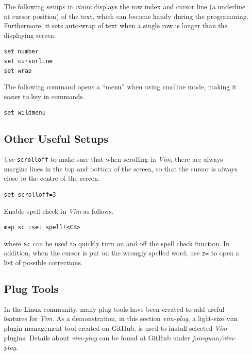The following setups in \textit{vimrc} displays the row index and cursor line (a underline at cursor position) of the text, which can become handy during the programming. Furthermore, it sets auto-wrap of text when a single row is longer than the displaying screen.
\begin{lstlisting}
set number
set cursorline
set wrap
\end{lstlisting}

The following command opens a ``menu'' when using cmdline mode, making it easier to key in commands.
\begin{lstlisting}
set wildmenu
\end{lstlisting}

\subsection{Other Useful Setups}

Use \verb|scrolloff| to make sure that when scrolling in \textit{Vim}, there are always margins lines in the top and bottom of the screen, so that the cursor is always close to the centre of the screen.
\begin{lstlisting}
set scrolloff=3
\end{lstlisting}

Enable spell check in \textit{Vim} as follows.
\begin{lstlisting}
map sc :set spell!<CR>
\end{lstlisting}
where \verb|sc| can be used to quickly turn on and off the spell check function. In addition, when the cursor is put on the wrongly spelled word, use \verb|z=| to open a list of possible corrections.

\subsection{Plug Tools}

In the Linux community, many plug tools have been created to add useful features for \textit{Vim}. As a demonstration, in this section \textit{vim-plug}, a light-size vim plugin management tool created on GitHub, is used to install selected \textit{Vim} plugins. Details about \textit{vim-plug} can be found at GitHub under \textit{junegunn/vim-plug}.

